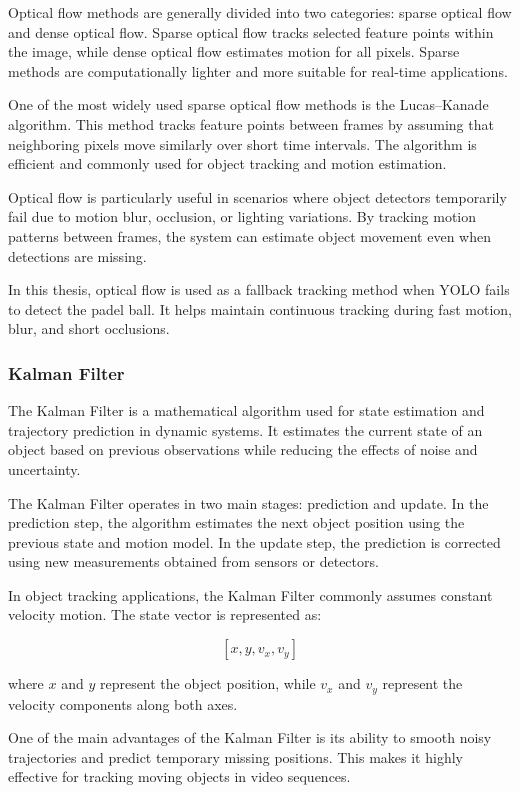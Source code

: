 Optical flow methods are generally divided into two categories: sparse optical flow and dense optical flow. Sparse optical flow tracks selected feature points within the image, while dense optical flow estimates motion for all pixels. Sparse methods are computationally lighter and more suitable for real-time applications.

One of the most widely used sparse optical flow methods is the Lucas--Kanade algorithm. This method tracks feature points between frames by assuming that neighboring pixels move similarly over short time intervals. The algorithm is efficient and commonly used for object tracking and motion estimation.

Optical flow is particularly useful in scenarios where object detectors temporarily fail due to motion blur, occlusion, or lighting variations. By tracking motion patterns between frames, the system can estimate object movement even when detections are missing.

In this thesis, optical flow is used as a fallback tracking method when YOLO fails to detect the padel ball. It helps maintain continuous tracking during fast motion, blur, and short occlusions.

\subsubsection{Kalman Filter}

The Kalman Filter is a mathematical algorithm used for state estimation and trajectory prediction in dynamic systems. It estimates the current state of an object based on previous observations while reducing the effects of noise and uncertainty.

The Kalman Filter operates in two main stages: prediction and update. In the prediction step, the algorithm estimates the next object position using the previous state and motion model. In the update step, the prediction is corrected using new measurements obtained from sensors or detectors.

In object tracking applications, the Kalman Filter commonly assumes constant velocity motion. The state vector is represented as:

\[
[x, y, v_x, v_y]
\]

where \(x\) and \(y\) represent the object position, while \(v_x\) and \(v_y\) represent the velocity components along both axes.

One of the main advantages of the Kalman Filter is its ability to smooth noisy trajectories and predict temporary missing positions. This makes it highly effective for tracking moving objects in video sequences.

